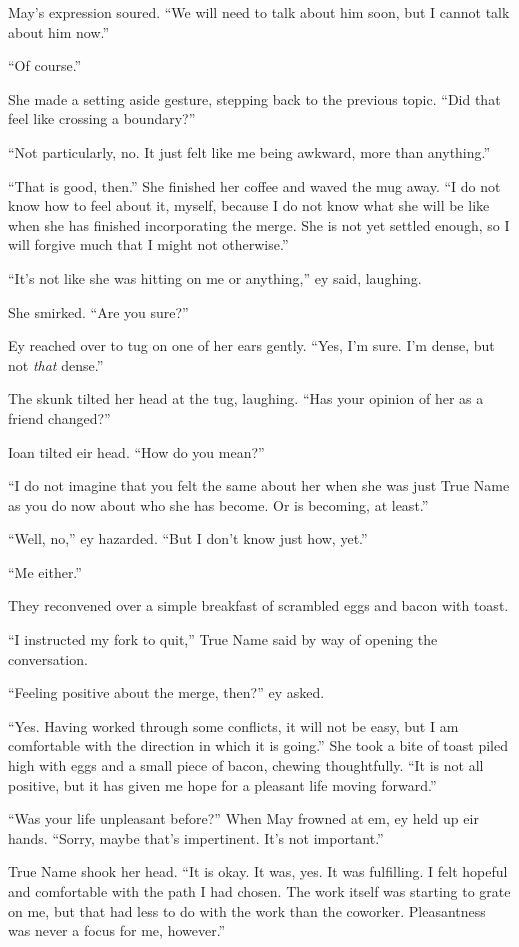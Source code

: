 May's expression soured. ``We will need to talk about him soon, but I cannot talk about him now.''

``Of course.''

She made a setting aside gesture, stepping back to the previous topic. ``Did that feel like crossing a boundary?''

``Not particularly, no. It just felt like me being awkward, more than anything.''

``That is good, then.'' She finished her coffee and waved the mug away. ``I do not know how to feel about it, myself, because I do not know what she will be like when she has finished incorporating the merge. She is not yet settled enough, so I will forgive much that I might not otherwise.''

``It's not like she was hitting on me or anything,'' ey said, laughing.

She smirked. ``Are you sure?''

Ey reached over to tug on one of her ears gently. ``Yes, I'm sure. I'm dense, but not \emph{that} dense.''

The skunk tilted her head at the tug, laughing. ``Has your opinion of her as a friend changed?''

Ioan tilted eir head. ``How do you mean?''

``I do not imagine that you felt the same about her when she was just True Name as you do now about who she has become. Or is becoming, at least.''

``Well, no,'' ey hazarded. ``But I don't know just how, yet.''

``Me either.''

They reconvened over a simple breakfast of scrambled eggs and bacon with toast.

``I instructed my fork to quit,'' True Name said by way of opening the conversation.

``Feeling positive about the merge, then?'' ey asked.

``Yes. Having worked through some conflicts, it will not be easy, but I am comfortable with the direction in which it is going.'' She took a bite of toast piled high with eggs and a small piece of bacon, chewing thoughtfully. ``It is not all positive, but it has given me hope for a pleasant life moving forward.''

``Was your life unpleasant before?'' When May frowned at em, ey held up eir hands. ``Sorry, maybe that's impertinent. It's not important.''

True Name shook her head. ``It is okay. It was, yes. It was fulfilling. I felt hopeful and comfortable with the path I had chosen. The work itself was starting to grate on me, but that had less to do with the work than the coworker. Pleasantness was never a focus for me, however.''

